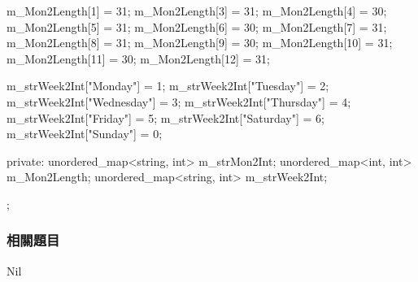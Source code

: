 \begin{Code}
{{        m_Mon2Length[1] = 31;
        m_Mon2Length[3] = 31;
        m_Mon2Length[4] = 30;
        m_Mon2Length[5] = 31;
        m_Mon2Length[6] = 30;
        m_Mon2Length[7] = 31;
        m_Mon2Length[8] = 31;
        m_Mon2Length[9] = 30;
        m_Mon2Length[10] = 31;
        m_Mon2Length[11] = 30;
        m_Mon2Length[12] = 31;

        m_strWeek2Int["Monday"] = 1;
        m_strWeek2Int["Tuesday"] = 2;
        m_strWeek2Int["Wednesday"] = 3;
        m_strWeek2Int["Thursday"] = 4;
        m_strWeek2Int["Friday"] = 5;
        m_strWeek2Int["Saturday"] = 6;
        m_strWeek2Int["Sunday"] = 0;
    }
private:
    unordered_map<string, int> m_strMon2Int;
    unordered_map<int, int> m_Mon2Length;
    unordered_map<string, int> m_strWeek2Int;
};
\end{Code}


\subsubsection{相關題目}
Nil
